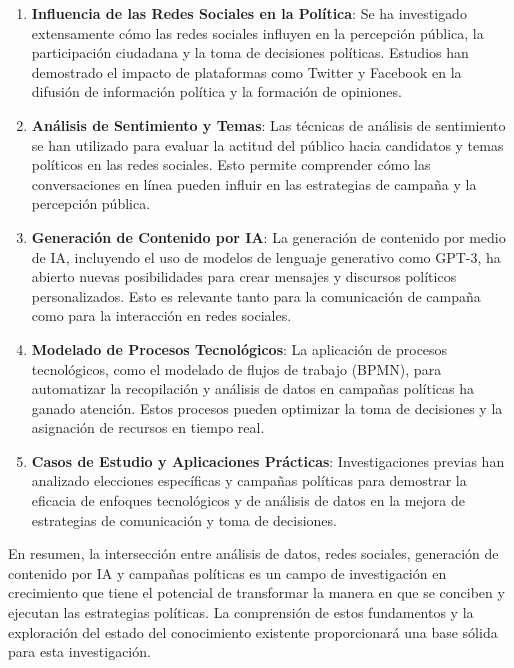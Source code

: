 \documentclass[12pt]{article}
\begin{document}
\begin{enumerate}
\item \textbf{Influencia de las Redes Sociales en la Política}: Se ha investigado extensamente cómo las redes sociales influyen en la percepción pública, la participación ciudadana y la toma de decisiones políticas. Estudios han demostrado el impacto de plataformas como Twitter y Facebook en la difusión de información política y la formación de opiniones.

\item \textbf{Análisis de Sentimiento y Temas}: Las técnicas de análisis de sentimiento se han utilizado para evaluar la actitud del público hacia candidatos y temas políticos en las redes sociales. Esto permite comprender cómo las conversaciones en línea pueden influir en las estrategias de campaña y la percepción pública.

\item \textbf{Generación de Contenido por IA}: La generación de contenido por medio de IA, incluyendo el uso de modelos de lenguaje generativo como GPT-3, ha abierto nuevas posibilidades para crear mensajes y discursos políticos personalizados. Esto es relevante tanto para la comunicación de campaña como para la interacción en redes sociales.

\item \textbf{Modelado de Procesos Tecnológicos}: La aplicación de procesos tecnológicos, como el modelado de flujos de trabajo (BPMN), para automatizar la recopilación y análisis de datos en campañas políticas ha ganado atención. Estos procesos pueden optimizar la toma de decisiones y la asignación de recursos en tiempo real.

\item \textbf{Casos de Estudio y Aplicaciones Prácticas}: Investigaciones previas han analizado elecciones específicas y campañas políticas para demostrar la eficacia de enfoques tecnológicos y de análisis de datos en la mejora de estrategias de comunicación y toma de decisiones.
\end{enumerate}

En resumen, la intersección entre análisis de datos, redes sociales, generación de contenido por IA y campañas políticas es un campo de investigación en crecimiento que tiene el potencial de transformar la manera en que se conciben y ejecutan las estrategias políticas. La comprensión de estos fundamentos y la exploración del estado del conocimiento existente proporcionará una base sólida para esta investigación.
\end{document}
